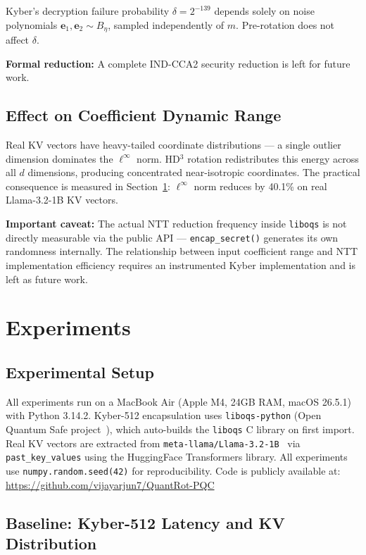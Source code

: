 \documentclass[preprint,a4paper]{article}
\begin{document}
Kyber's decryption failure probability
$\delta = 2^{-139}$ depends solely on noise polynomials
$\mathbf{e}_1, \mathbf{e}_2 \sim B_\eta$, sampled
independently of $m$. Pre-rotation does not affect
$\delta$.

\textbf{Formal reduction:} A complete IND-CCA2 security
reduction is left for future work.

\subsection{Effect on Coefficient Dynamic Range}
\label{sec:dynamic_range}

Real KV vectors have heavy-tailed coordinate
distributions --- a single outlier dimension dominates
the $\ell^\infty$ norm. HD$^3$ rotation redistributes
this energy across all $d$ dimensions, producing
concentrated near-isotropic coordinates.
The practical consequence is measured in
Section~\ref{sec:experiments}: $\ell^\infty$ norm reduces
by 40.1\% on real Llama-3.2-1B KV vectors.

\textbf{Important caveat:} The actual NTT reduction
frequency inside \texttt{liboqs} is not directly
measurable via the public API ---
\texttt{encap\_secret()} generates its own randomness
internally. The relationship between input coefficient
range and NTT implementation efficiency requires an
instrumented Kyber implementation and is left as
future work.

\section{Experiments}
\label{sec:experiments}
\subsection{Experimental Setup}
\label{sec:setup}

All experiments run on a MacBook Air (Apple M4,
24GB RAM, macOS 26.5.1) with Python 3.14.2.
Kyber-512 encapsulation uses \texttt{liboqs-python}
(Open Quantum Safe project~\cite{liboqs}), which
auto-builds the \texttt{liboqs} C library on first
import. Real KV vectors are extracted from
\texttt{meta-llama/Llama-3.2-1B}~\cite{llama2024}
via \texttt{past\_key\_values} using the HuggingFace
Transformers library. All experiments use
\texttt{numpy.random.seed(42)} for reproducibility.
Code is publicly available at:
\url{https://github.com/vijayarjun7/QuantRot-PQC}

\subsection{Baseline: Kyber-512 Latency and KV
Distribution}
\label{sec:baseline}
\end{document}
